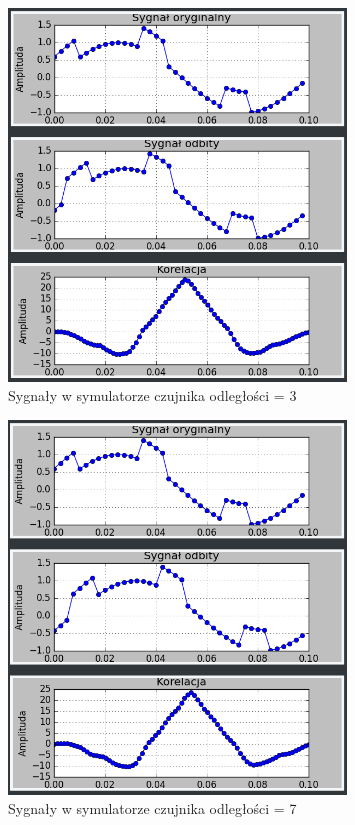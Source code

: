 \documentclass{article}
\begin{document}
{{\begin{figure}[h!]
                \includegraphics[width=0.8\textwidth]{img/sim10.png}
                \caption{Sygnały w symulatorze czujnika odległości = 3}
            \end{figure}
            \begin{figure}[h!]
                \centering
                \includegraphics[width=0.8\textwidth]{img/sim11.png}
                \caption{Sygnały w symulatorze czujnika odległości = 7}

\end{figure}}}
\end{document}
